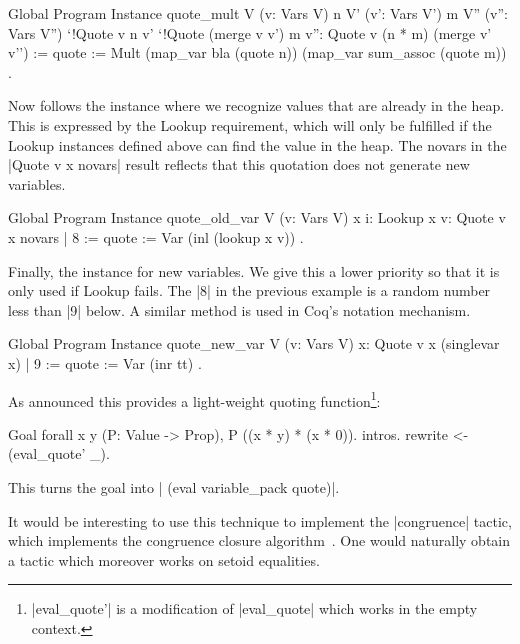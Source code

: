 \documentclass[a4paper,10pt,runningheads]{llncs}
\begin{document}
\begin{code}
Global Program Instance quote_mult V (v: Vars V)
  n V' (v': Vars V') m V'' (v'': Vars V'')
  `{!Quote v n v'} `{!Quote (merge v v') m v''}:
  Quote v (n * m) (merge v' v'') :=
  { quote := Mult (map_var bla (quote n)) (map_var sum_assoc (quote m)) }.
\end{code}
  Now follows the instance where we recognize values that are already in the heap. This
   is expressed by the Lookup requirement, which will only be fulfilled if the Lookup instances
   defined above can find the value in the heap. The novars in the |Quote v x novars| result
   reflects that this quotation does not generate new variables.

\begin{code}
Global Program Instance quote_old_var
  V (v: Vars V) x {i: Lookup x v}:
  Quote v x novars | 8 := { quote := Var (inl (lookup x v)) }.
\end{code}

\noindent Finally, the instance for new variables. We give this a lower priority so that it is only
used if Lookup fails. The |8| in the previous example is a random number less than |9| below. A
similar method is used in Coq's notation mechanism.

\begin{code}
Global Program Instance quote_new_var V (v: Vars V) x:
  Quote v x (singlevar x) | 9 := { quote := Var (inr tt) }.
\end{code}

\noindent As announced this provides a light-weight quoting function\footnote{|eval_quote'| is a
modification of |eval_quote| which works in the empty context.}:
\begin{code}
Goal forall x y (P: Value -> Prop), P ((x * y) * (x * 0)).
  intros. rewrite <- (eval_quote' _).
\end{code}
This turns the goal into | (eval variable_pack quote)|.

It would be interesting to use this technique to implement the |congruence| tactic, which implements
the congruence closure algorithm~\cite{corbineau2007deciding}. One would naturally obtain a tactic
which moreover works on setoid equalities.
\end{document}
